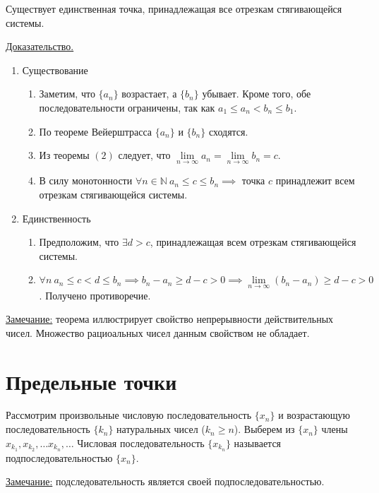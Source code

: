 \documentclass{article}
\begin{document}
\begin{lemma}
    \noindent Существует единственная точка, принадлежащая все отрезкам стягивающейся системы.  
\end{lemma}
\noindent \underline{Доказательство.}
\begin{enumerate}
    \item Существование
    \begin{enumerate}
        \item Заметим, что \(\{a_n\}\) возрастает, а \(\{b_n\}\) убывает. Кроме того, обе последовательности ограничены, так как \(a_1 \leq a_n < b_n \leq b_1\).
        \item По теореме Вейерштрасса \(\{a_n\}\) и \(\{b_n\}\) сходятся.
        \item Из теоремы \({(2)}\) следует, что \( \lim\limits_{n \to \infty } a_n = \lim\limits_{n \to \infty } b_n = c\).
        \item В силу монотонности \(\forall n \in \mathbb{N}\ a_n \leq c \leq b_n \implies \) точка \(c\) принадлежит всем отрезкам стягивающейся системы.
    \end{enumerate}
    \item Единственность
    \begin{enumerate}
        \item Предположим, что \(\exists d > c\), принадлежащая всем отрезкам стягивающейся системы.
        \item \(\forall n\ a_n \leq c < d \leq b_n \implies b_n - a_n \geq d - c > 0 \implies \lim\limits_{n \to \infty} (b_n - a_n) \geq d - c > 0\). Получено противоречие.
    \end{enumerate}    
\end{enumerate}
\noindent \underline{Замечание:} теорема иллюстрирует свойство непрерывности действительных чисел. Множество рациоальных чисел данным свойством не обладает.

\section{Предельные точки}

\begin{definition}
    \noindent Рассмотрим произвольные числовую последовательность \(\{x_n\}\) и возрастающую последовательность \(\{k_n\}\) натуральных чисел (\(k_n \geq n\)). Выберем из \(\{x_n\}\) члены \(x_{k_1}, x_{k_2}, \dots x_{k_n}, \dots \) Числовая последовательность \(\{x_{k_n}\}\) называется подпоследовательностью \(\{x_n\}\).  
\end{definition}
\noindent \underline{Замечание:} подследовательность является своей подпоследовательностью.
\end{document}
